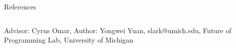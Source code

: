 \documentclass[notheorems]{beamer}
\theoremstyle{slplain}
\numberwithin{thm}{section}
\newlength{\sepwid}
\newlength{\onecolwid}
\begin{document}
\begin{frame}[containsverbatim]
\begin{columns}[t]
\begin{column}{\onecolwid}

\begin{block}{References}

\small{
\vspace{1cm}}
\end{block}



\end{column} %


\begin{column}{\sepwid}\end{column} %

\end{columns} %

\hspace{2in}\small{Advisor: Cyrus Omar, Author: Yongwei Yuan, slark@umich.edu, Future of Programming Lab, University of Michigan}
\end{frame} %
\end{document}

